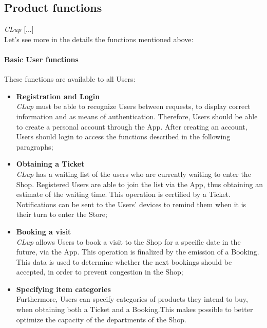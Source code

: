 \subsection{Product functions}
{
    \todo
    \noindent\emph{CLup} [...]
\\Let's see more in the details the functions mentioned above:
}

\paragraph{Basic User functions} These functions are available to all Users:
\begin{itemize}
    \item \textbf{Registration and Login}\\
    \emph{CLup} must be able to recognize Users between requests, to display correct information and as means of authentication. Therefore, Users should be able to create a personal account through the App. After creating an account, Users should login to access the functions described in the following paragraphs;
    \item \textbf{Obtaining a Ticket}\\
    \emph{CLup} has a waiting list of the users who are currently waiting to enter the Shop. Registered Users are able to join the list via the App, thus obtaining an estimate of the waiting time. This operation is certified by a Ticket. Notifications can be sent to the Users' devices to remind them when it is their turn to enter the Store;
    \item\textbf{Booking a visit}\\
    \emph{CLup} allows Users to book a visit to the Shop for a specific date in the future, via the App. This operation is finalized by the emission of a Booking. This data is used to determine whether the next bookings should be accepted, in order to prevent congestion in the Shop;
    \item\textbf{Specifying item categories}\\
    Furthermore, Users can specify categories of products they intend to buy, when obtaining both a Ticket and a Booking.This makes possible to better optimize the capacity of the departments of the Shop.
    \end{itemize}
    
